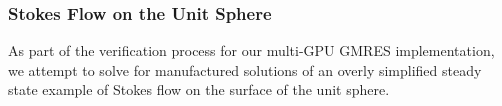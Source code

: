 

\subsubsection{Stokes Flow on the Unit Sphere}

As part of the verification process for our multi-GPU GMRES implementation, we attempt to solve for manufactured solutions of an overly simplified steady state example of Stokes flow on the surface of the unit sphere. 



